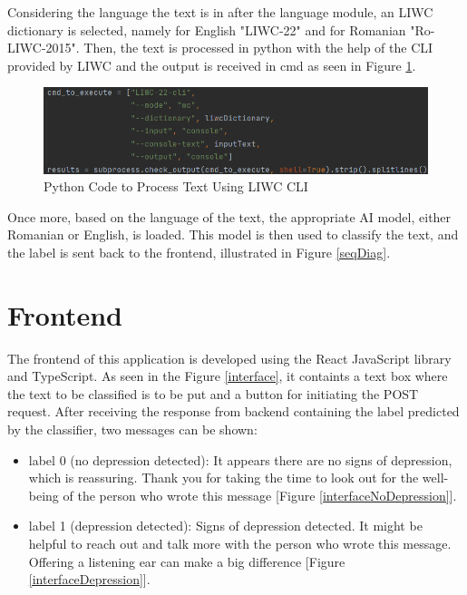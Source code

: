 Considering the language the text is in after the language module, an LIWC dictionary is selected, namely for English "LIWC-22" and for Romanian "Ro-LIWC-2015". Then, the text is processed in python with the help of the CLI provided by LIWC and the output is received in cmd as seen in Figure \ref{codeLiwcCli}.

\begin{figure}[htbp]
	\centering
		\includegraphics[scale=0.5]{LaTeX Bachelor Thesis Depression Signs Detection/figures/codeLiwcCLI.png}
	\caption{Python Code to Process Text Using LIWC CLI }
	\label{codeLiwcCli}
\end{figure}

Once more, based on the language of the text, the appropriate AI model, either Romanian or English, is loaded. This model is then used to classify the text, and the label is sent back to the frontend, illustrated in Figure \ref{seqDiag}.

\section{Frontend}

\quad The frontend of this application is developed using the React JavaScript library and TypeScript. As seen in the Figure \ref{interface}, it containts a text box where the text to be classified is to be put and a button for initiating the POST request. After receiving the response from backend containing the label predicted by the classifier, two messages can be shown:
\begin{itemize}
    \item label 0 (no depression detected): It appears there are no signs of depression, which is reassuring. Thank you for taking the time to look out for the well-being of the person who wrote this message [Figure \ref{interfaceNoDepression}].
    \item label 1 (depression detected):  Signs of depression detected. It might be helpful to reach out and talk more with the person who wrote this message. Offering a listening ear can make a big difference [Figure \ref{interfaceDepression}].
\end{itemize}

